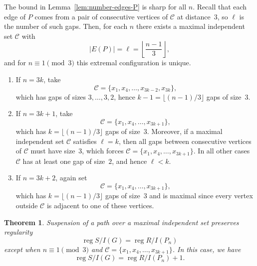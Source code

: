 \documentclass[12pt]{amsart}
\theoremstyle{plain}
\newtheorem{thm}{Theorem}[section]
\theoremstyle{definition}
\DeclareMathOperator{\reg}{reg}
\begin{document}
\begin{remark}\label{rem:extremal-C}
The bound in Lemma~\ref{lem:number-edges-P} is sharp for all $n$.   Recall that each edge of $P$ comes from a pair of consecutive vertices of $\mathcal{C}$ 
at distance~$3$, so $\ell$ is the number of such gaps. Then, for each $n$ there exists a maximal independent set $\mathcal{C}$  with
\[
|E(P)| = \ell = \left\lfloor \frac{n-1}{3} \right\rfloor,
\]
and for $n\equiv 1 \pmod 3$ this extremal configuration is unique.

\begin{enumerate}
    \item[(a)] If $n=3k$, take
\[
\mathcal{C} = \{x_1,x_4,\dots,x_{3k-2},x_{3k}\},
\]
which has gaps of sizes $3,\dots,3,2$, hence $k-1=\lfloor (n-1)/3\rfloor$ gaps of size~$3$.

    \item[(b)] If $n=3k+1$, take
\[
\mathcal{C}= \{x_1,x_4,\dots,x_{3k+1}\},
\]
which has $k=\lfloor (n-1)/3\rfloor$ gaps of size~$3$. Moreover, if a maximal independent set $\mathcal{C}$ 
satisfies $\ell=k$, then all gaps between consecutive vertices of $\mathcal{C}$  must have size~$3$, which forces
$\mathcal{C}=\{x_1,x_4,\dots,x_{3k+1}\}$. In all other cases $\mathcal{C}$  has at least one gap of size~$2$, and hence
$\ell<k$.

    \item[(c)] If $n=3k+2$, again set
\[
\mathcal{C} = \{x_1,x_4,\dots,x_{3k+1}\},
\]
which has $k=\lfloor (n-1)/3\rfloor$ gaps of size~$3$ and is maximal since every vertex outside $\mathcal{C}$ 
is adjacent to one of these vertices.
\end{enumerate} 
\end{remark}




\begin{thm}\label{thm:path_reg}
Suspension of a path over a maximal independent set preserves regularity
$$\reg S/ I(G)= \reg R/I(P_n)$$ 
except when $n\equiv 1 \pmod 3$ and $\mathcal{C}=\{x_1,x_4,\ldots, x_{3k+1}\}$. In this case, we have 
$$\reg S/ I(G)= \reg R/I(P_n)+1.$$
\end{thm}
\end{document}
